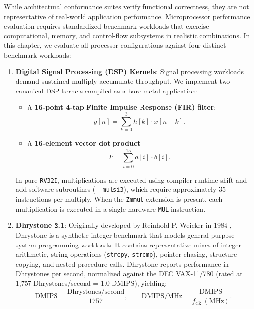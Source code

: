 While architectural conformance suites verify functional correctness, they are not representative of real-world application performance. Microprocessor performance evaluation requires standardized benchmark workloads that exercise computational, memory, and control-flow subsystems in realistic combinations. In this chapter, we evaluate all processor configurations against four distinct benchmark workloads:

\begin{enumerate}
    \item \textbf{Digital Signal Processing (DSP) Kernels}:
    Signal processing workloads demand sustained multiply-accumulate throughput. We implement two canonical DSP kernels compiled as a bare-metal application:
    \begin{itemize}
        \item A \textbf{16-point 4-tap Finite Impulse Response (FIR) filter}:
        \begin{equation}
        y[n] = \sum_{k=0}^{3} h[k] \cdot x[n-k].
        \end{equation}
        \item A \textbf{16-element vector dot product}:
        \begin{equation}
        P = \sum_{i=0}^{15} a[i] \cdot b[i].
        \end{equation}
    \end{itemize}
    In pure \texttt{RV32I}, multiplications are executed using compiler runtime shift-and-add software subroutines (\texttt{\_\_mulsi3}), which require approximately 35 instructions per multiply. When the \texttt{Zmmul} extension is present, each multiplication is executed in a single hardware \texttt{MUL} instruction.
    
    \item \textbf{Dhrystone 2.1}:
    Originally developed by Reinhold P. Weicker in 1984 \cite{weicker1984dhrystone}, Dhrystone is a synthetic integer benchmark that models general-purpose system programming workloads. It contains representative mixes of integer arithmetic, string operations (\texttt{strcpy}, \texttt{strcmp}), pointer chasing, structure copying, and nested procedure calls. Dhrystone reports performance in Dhrystones per second, normalized against the DEC VAX-11/780 (rated at 1,757 Dhrystones/second = 1.0 DMIPS), yielding:
    \begin{equation}
    \text{DMIPS} = \frac{\text{Dhrystones/second}}{1757}, \qquad \text{DMIPS/MHz} = \frac{\text{DMIPS}}{f_{\text{clk}} \ (\text{MHz})}.
    \end{equation}
    

\end{enumerate}
